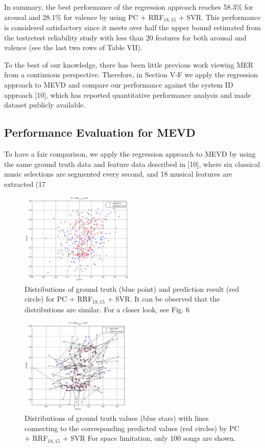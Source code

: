 \documentclass[journal, twoside]{IEEEtran}
\begin{document}
In summary, the best performance of the regression approach reaches 58.3\% for arousal and 28.1\% for valence by using PC $+$ RRF$_{18,15}$ $+$ SVR. This performance is considered satisfactory since it meets over half the upper bound estimated from the testretest reliability study with less than 20 features for both arousal and valence (see the last two rows of Table VII).

To the best of our knowledge, there has been little previous work viewing MER from a continuous perspective. Therefore, in Section V-F we apply the regression approach to MEVD and compare our performance against the system ID approach [10], which has reported quantitative performance analysis and made dataset publicly available.

\subsection{ Performance Evaluation for MEVD}
To have a fair comparison, we apply the regression approach to MEVD by using the same ground truth data and feature data described in [10], where six classical music selections are segmented every second, and 18 musical features are extracted (17

\begin{figure}[h]
\centering
\captionsetup{justification=centering}
\includegraphics[width=0.48\textwidth, height=0.3\textwidth]{fig5.png}
\caption{Distributions of ground truth (blue point) and prediction result (red
circle) for PC + RRF$_{18,15}$ + SVR. It can be observed that the distributions
are similar. For a closer look, see Fig. 6}
\label{fig3}
\end{figure}

\begin{figure}[h]
\centering
\captionsetup{justification=centering}
\includegraphics[width=0.48\textwidth, height=0.4\textwidth]{fig6.png}
\caption{Distributions of ground truth values (blue stars) with lines connecting
to the corresponding predicted values (red circles) by PC + RRF$_{18,15}$ + SVR
For space limitation, only 100 songs are shown.}
\label{fig3}
\end{figure}
\end{document}
